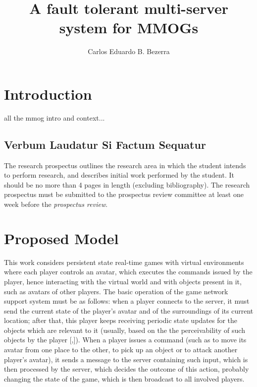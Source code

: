\documentclass[]{usiinfprospectus}
\author{Carlos Eduardo B. Bezerra}
\title{A fault tolerant multi-server system for MMOGs}
\begin{document}
\maketitle

\section{Introduction} \label{sec_introduction}

all the mmog intro and context...

\subsection{Verbum Laudatur Si Factum Sequatur}

The research prospectus outlines the research area in which the student intends to perform research, and describes initial work performed by the student. It should be no more than 4 pages in length (excluding bibliography). The research prospectus must be submitted to the prospectus review committee at least one week before the {\em prospectus review}.

\section{Proposed Model} \label{sec:model}

This work considers persistent state real-time games with virtual environments where each player controls an avatar, which executes the commands issued by the player, hence interacting with the virtual world and with objects present in it, such as avatars of other players. The basic operation of the game network support system must be as follows: when a player connects to the server, it must send the current state of the player's avatar and of the surroundings of its current location; after that, this player keeps receiving periodic state updates for the objects which are relevant to it (usually, based on the the perceivability of such objects by the player [,]). When a player issues a command (such as to move its avatar from one place to the other, to pick up an object or to attack another player's avatar), it sends a message to the server containing such input, which is then processed by the server, which decides the outcome of this action, probably changing the state of the game, which is then broadcast to all involved players.
\end{document}
